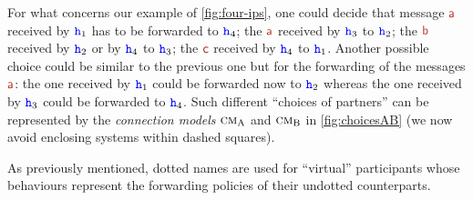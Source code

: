  For what concerns  our example of \cref{fig:four-ips},
 one could decide that message $\msg[a]$ received by ${\mathtt{\color{blue}{ {h}}}}_1$ has 
 to be forwarded
 to ${\mathtt{\color{blue}{ {h}}}}_4$; the $\msg[a]$ received by ${\mathtt{\color{blue}{ {h}}}}_3$
 to ${\mathtt{\color{blue}{ {h}}}}_2$; the $\msg[b]$ received by ${\mathtt{\color{blue}{ {h}}}}_2$ 
 or by ${\mathtt{\color{blue}{ {h}}}}_4$ to ${\mathtt{\color{blue}{ {h}}}}_3$; 
 the $\msg[c]$ received by ${\mathtt{\color{blue}{ {h}}}}_4$ to ${\mathtt{\color{blue}{ {h}}}}_1$.
 Another possible choice %
could be similar to the previous one but for the forwarding
of the messages $\msg[a]$: the one received by ${\mathtt{\color{blue}{ {h}}}}_1$ could be forwarded now to ${\mathtt{\color{blue}{ {h}}}}_2$
whereas the one received by ${\mathtt{\color{blue}{ {h}}}}_3$ could be forwarded to ${\mathtt{\color{blue}{ {h}}}}_4$. 
 Such different ``choices of partners'' can be represented 
 by the {\em connection models} $\text{\sc cm}_\mathrm{A}$ and $\text{\sc cm}_\mathrm{B}$ in \cref{fig:choicesAB} (we now avoid enclosing systems within dashed squares).
  
As previously mentioned, dotted names are used for ``virtual'' participants whose behaviours  represent 
 the forwarding policies of their undotted counterparts.
 

